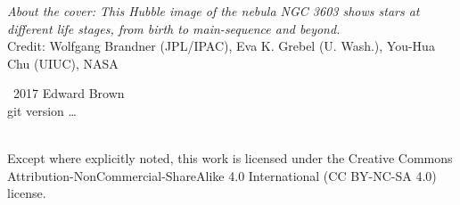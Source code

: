 
\maketitle
\newpage
\begin{fullwidth}
\thispagestyle{empty}

\vspace{3\baselineskip}
\noindent \textit{About the cover: This Hubble image of the nebula NGC 3603 shows stars at different life stages, from birth to main-sequence and beyond.} \\
\noindent Credit: Wolfgang Brandner (JPL/IPAC), Eva K. Grebel (U. Wash.), You-Hua Chu (UIUC), NASA

\vfill
\noindent \ccCopy\ 2017 Edward Brown\\
\noindent git version \ldots

\vspace{3\baselineskip}
\noindent \ccbyncsa \\
\noindent Except where explicitly noted, this work is licensed under the Creative Commons
Attribution-NonCommercial-ShareAlike 4.0 International (CC BY-NC-SA
4.0) license.

\end{fullwidth}

\newpage


\tableofcontents
\listoffigures
\listofexercises
\listofsidebars
